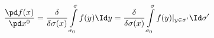 \begin{equation}	\label{12.12}
\frac{\pd f(x)}{\pd x^0}
=
\frac{\delta}{\delta\sigma(x)}
	\int\limits_{\sigma_0}^{\sigma} f(y)\Id y
=
\frac{\delta}{\delta\sigma(x)}
	\int\limits_{\sigma_0}^{\sigma} f(y)|_{y\in\sigma'}\Id\sigma'
	\end{equation}

